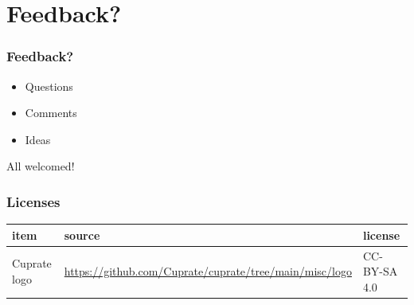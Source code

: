 \documentclass[aspectratio=169]{beamer}
\begin{document}
\section{Feedback?}
\begin{frame}
  \frametitle{Feedback?}
  \begin{itemize}
    \setlength\itemsep{1em}
    \item Questions
    \item Comments
    \item Ideas
  \end{itemize}
  \vspace{2em}
  All welcomed!
\end{frame}

\begin{frame}
  \frametitle{Licenses}
  {\scriptsize
    \begin{tabular}{l | l | l}
      item & source & license \\
      \hline
      Cuprate logo & \url{https://github.com/Cuprate/cuprate/tree/main/misc/logo} & CC-BY-SA 4.0 \\
    \end{tabular}
  }
\end{frame}
\end{document}
